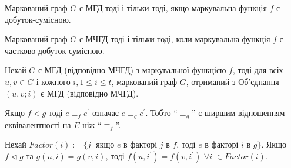 \begin{lemma}
  Маркований граф $G$ є МГД тоді і тільки тоді, якщо маркувальна функція $f$ є добуток-сумісною. 
\end{lemma}

\begin{lemma}
  Маркований граф $G$ є МЧГД тоді і тільки тоді, коли маркувальна функція $f$ є частково добуток-сумісною.
\end{lemma}

\begin{lemma}
  Нехай $G$ є МГД (відповідно МЧГД) з маркувальної функцією $f$, тоді для всіх $u,v \in G$ і кожного $i, 1 \le i \le t$, маркований граф $G$, отриманий з Об'єднання$(u,v;i)$ є МГД (відповідно МЧГД).
\end{lemma}

\begin{lemma}
  Якщо $f \triangleleft g$ тоді $e \equiv_f e^\prime$ означає $e \equiv_g e^\prime$. Тобто ``$\equiv_g$'' є ширшим відношенням еквівалентності на $E$ ніж ``$\equiv_f$''.
\end{lemma}

\begin{lemma}
  Нехай $Factor(i):=\lbrace j \vert$ якщо $e$ в факторі $j$ в $f$, тоді $e$ в факторі $i$ в $g \rbrace$. Якщо $f \triangleleft g$ та $g(u,i)=g(v,i)$, тоді $f(u,i^\prime)=f(v,i^\prime)$ $\forall i^\prime \in Factor(i)$.
\end{lemma}
